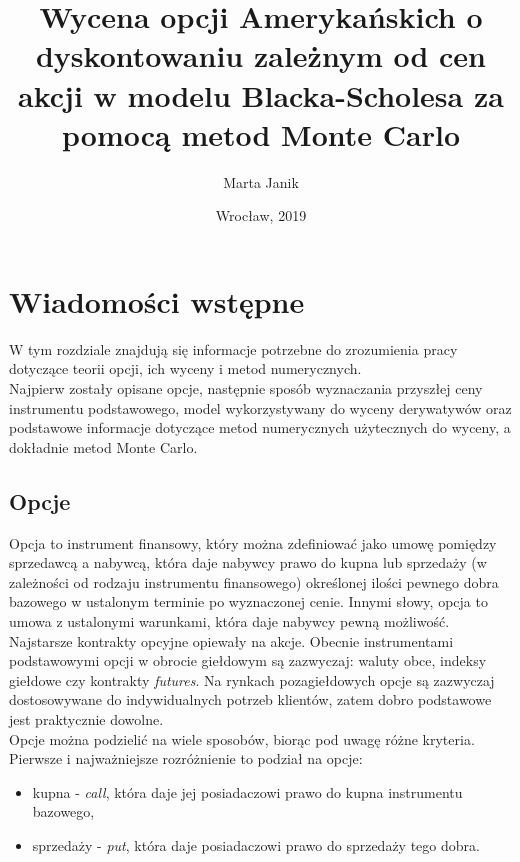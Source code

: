 \documentclass[12pt]{article}
\begin{document}
\title{Wycena opcji Amerykańskich o dyskontowaniu zależnym od cen akcji w modelu Blacka-Scholesa za pomocą metod Monte Carlo}
\author{Marta Janik}
\date{Wrocław, 2019}

\maketitle
\tableofcontents

\section{Wiadomości wstępne}
W tym rozdziale znajdują się informacje potrzebne do zrozumienia pracy dotyczące teorii opcji, ich wyceny i metod numerycznych.\\
Najpierw zostały opisane opcje, następnie sposób wyznaczania przyszłej ceny instrumentu podstawowego, model wykorzystywany do wyceny derywatywów oraz podstawowe informacje dotyczące metod numerycznych użytecznych do wyceny, a dokładnie metod Monte Carlo.

\subsection{Opcje}
Opcja to instrument finansowy, który można zdefiniować jako umowę pomiędzy sprzedawcą a nabywcą, która daje nabywcy prawo do kupna lub sprzedaży (w zależności od rodzaju instrumentu finansowego) określonej ilości pewnego dobra bazowego w ustalonym terminie po wyznaczonej cenie. Innymi słowy, opcja to umowa z ustalonymi warunkami, która daje nabywcy pewną możliwość.
Najstarsze kontrakty opcyjne opiewały na akcje. Obecnie instrumentami podstawowymi opcji w obrocie giełdowym są zazwyczaj: waluty obce, indeksy giełdowe czy kontrakty \textit{futures}. Na rynkach pozagiełdowych opcje są zazwyczaj dostosowywane do indywidualnych potrzeb klientów, zatem dobro podstawowe jest praktycznie dowolne.\\

Opcje można podzielić na wiele sposobów, biorąc pod uwagę różne kryteria. Pierwsze i najważniejsze rozróżnienie to podział na opcje:
\begin{itemize}
\item kupna - \textit{call}, która daje jej posiadaczowi prawo do kupna instrumentu bazowego,
\item sprzedaży - \textit{put}, która daje posiadaczowi prawo do sprzedaży tego dobra.
\end{itemize}
\end{document}
